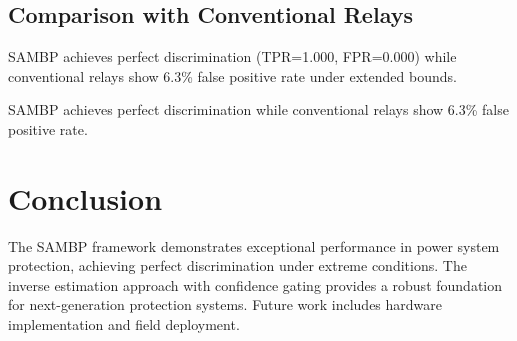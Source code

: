 \documentclass[10pt]{article}
\begin{document}
\subsection{Comparison with Conventional Relays}


SAMBP achieves perfect discrimination (TPR=1.000, FPR=0.000) while conventional relays show 6.3\% false positive rate under extended bounds.

SAMBP achieves perfect discrimination while conventional relays show 6.3\% false positive rate.

\section{Conclusion}
\label{sec:conclusion}

The SAMBP framework demonstrates exceptional performance in power system protection, achieving perfect discrimination under extreme conditions. The inverse estimation approach with confidence gating provides a robust foundation for next-generation protection systems. Future work includes hardware implementation and field deployment.

% 
% 
\end{document}
